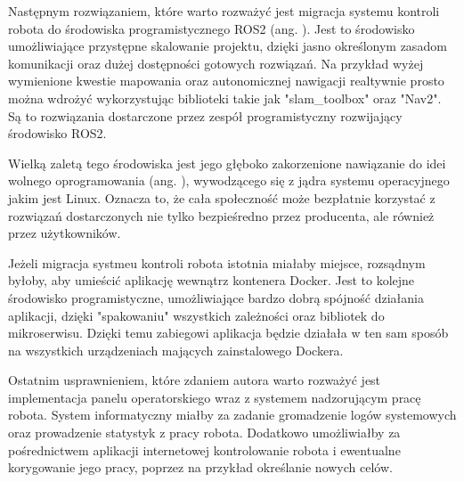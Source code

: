 \vspace*{l}

Następnym rozwiązaniem, które warto rozważyć jest migracja systemu kontroli robota do środowiska programistycznego ROS2 (ang. ). Jest to środowisko umożliwiające przystępne skalowanie projektu, dzięki jasno określonym zasadom komunikacji oraz dużej dostępności gotowych rozwiązań. Na przykład wyżej wymienione kwestie mapowania oraz autonomicznej nawigacji realtywnie prosto można wdrożyć wykorzystując biblioteki takie jak "slam\_toolbox" oraz "Nav2". Są to rozwiązania dostarczone przez zespół programistyczny rozwijający środowisko ROS2. 

Wielką zaletą tego środowiska jest jego głęboko zakorzenione nawiązanie do idei wolnego oprogramowania (ang. ), wywodzącego się z jądra systemu operacyjnego jakim jest Linux. Oznacza to, że cała społeczność może bezpłatnie korzystać z rozwiązań dostarczonych nie tylko bezpieśredno przez producenta, ale również przez użytkowników. 

Jeżeli migracja systmeu kontroli robota istotnia miałaby miejsce, rozsądnym byłoby, aby umieścić aplikację wewnątrz kontenera Docker. Jest to kolejne środowisko programistyczne, umożliwiające bardzo dobrą spójność działania aplikacji, dzięki "spakowaniu" wszystkich zależności oraz bibliotek do mikroserwisu. Dzięki temu zabiegowi aplikacja będzie działała w ten sam sposób na wszystkich urządzeniach mających zainstalowego Dockera. 

\vspace*{l}

Ostatnim usprawnieniem, które zdaniem autora warto rozważyć jest implementacja panelu operatorskiego wraz z systemem nadzorującym pracę robota. System informatyczny miałby za zadanie gromadzenie logów systemowych oraz prowadzenie statystyk z pracy robota. Dodatkowo umożliwiałby za pośrednictwem aplikacji internetowej kontrolowanie robota i ewentualne korygowanie jego pracy, poprzez na przykład określanie nowych celów. 

